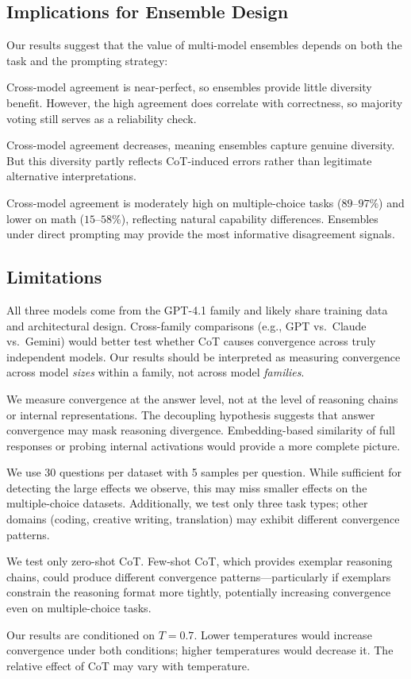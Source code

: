 \subsection{Implications for Ensemble Design}

Our results suggest that the value of multi-model ensembles depends on both the task and the prompting strategy:

 Cross-model agreement is near-perfect, so ensembles provide little diversity benefit. However, the high agreement does correlate with correctness, so majority voting still serves as a reliability check.

 Cross-model agreement decreases, meaning ensembles capture genuine diversity. But this diversity partly reflects CoT-induced errors rather than legitimate alternative interpretations.

 Cross-model agreement is moderately high on multiple-choice tasks ($89$--$97\%$) and lower on math ($15$--$58\%$), reflecting natural capability differences. Ensembles under direct prompting may provide the most informative disagreement signals.

\subsection{Limitations}

 All three models come from the GPT-4.1 family and likely share training data and architectural design. Cross-family comparisons (e.g., GPT vs.\ Claude vs.\ Gemini) would better test whether CoT causes convergence across truly independent models. Our results should be interpreted as measuring convergence across model \emph{sizes} within a family, not across model \emph{families}.

 We measure convergence at the answer level, not at the level of reasoning chains or internal representations. The decoupling hypothesis \citep{matcha2025, chen2023two} suggests that answer convergence may mask reasoning divergence. Embedding-based similarity of full responses or probing internal activations would provide a more complete picture.

 We use 30 questions per dataset with 5 samples per question. While sufficient for detecting the large effects we observe, this may miss smaller effects on the multiple-choice datasets. Additionally, we test only three task types; other domains (coding, creative writing, translation) may exhibit different convergence patterns.

 We test only zero-shot CoT. Few-shot CoT, which provides exemplar reasoning chains, could produce different convergence patterns---particularly if exemplars constrain the reasoning format more tightly, potentially increasing convergence even on multiple-choice tasks.

 Our results are conditioned on $T = 0.7$. Lower temperatures would increase convergence under both conditions; higher temperatures would decrease it. The relative effect of CoT may vary with temperature.
